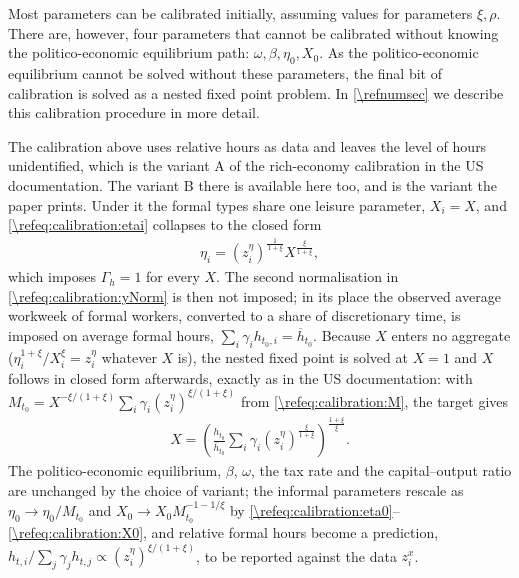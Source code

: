 Most parameters can be calibrated initially, assuming values for parameters $\xi, \rho$. There are, however, four parameters that cannot be calibrated without knowing the politico-economic equilibrium path: $\omega, \beta, \eta_0, X_0$. As the politico-economic equilibrium cannot be solved without these parameters, the final bit of calibration is solved as a nested fixed point problem. In \cref{\refnumsec} we describe this calibration procedure in more detail.

 The calibration above uses relative hours as data and leaves the level of hours unidentified, which is the variant A of the rich-economy calibration in the US documentation. The variant B there is available here too, and is the variant the paper prints. Under it the formal types share one leisure parameter, $X_i = X$, and \eqref{\refeq:calibration:etai} collapses to the closed form
\begin{align}\label{\refeq:calibration:etaCommonX}
    \eta_i = \left(z_i^{\eta}\right)^{\frac{1}{1+\xi}}X^{\frac{\xi}{1+\xi}},
\end{align}
which imposes $\Gamma_h = 1$ for every $X$. The second normalisation in \eqref{\refeq:calibration:yNorm} is then not imposed; in its place the observed average workweek of formal workers, converted to a share of discretionary time, is imposed on average formal hours, $\sum_i\gamma_ih_{t_0,i} = \overline{h}_{t_0}$. Because $X$ enters no aggregate ($\eta_i^{1+\xi}/X_i^{\xi} = z_i^{\eta}$ whatever $X$ is), the nested fixed point is solved at $X = 1$ and $X$ follows in closed form afterwards, exactly as in the US documentation: with $M_{t_0} = X^{-\xi/(1+\xi)}\sum_i\gamma_i(z_i^{\eta})^{\xi/(1+\xi)}$ from \eqref{\refeq:calibration:M}, the target gives
\begin{align}\label{\refeq:calibration:Xsolve}
    X = \left(\frac{h_{t_0}}{\overline{h}_{t_0}}\sum_i\gamma_i\left(z_i^{\eta}\right)^{\frac{\xi}{1+\xi}}\right)^{\frac{1+\xi}{\xi}}.
\end{align}
The politico-economic equilibrium, $\beta$, $\omega$, the tax rate and the capital--output ratio are unchanged by the choice of variant; the informal parameters rescale as $\eta_0\rightarrow\eta_0/M_{t_0}$ and $X_0\rightarrow X_0M_{t_0}^{-1-1/\xi}$ by \eqref{\refeq:calibration:eta0}--\eqref{\refeq:calibration:X0}, and relative formal hours become a prediction, $h_{t,i}/\sum_j\gamma_jh_{t,j} \propto (z_i^{\eta})^{\xi/(1+\xi)}$, to be reported against the data $z_i^x$.